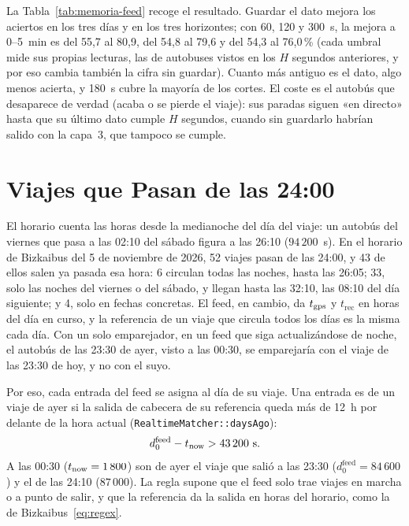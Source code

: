 La Tabla~\ref{tab:memoria-feed} recoge el resultado. Guardar el dato mejora los aciertos en los tres días y en los tres
horizontes; con 60, 120 y 300~s, la mejora a 0--5~min es del 55{,}7 al 80{,}9, del 54{,}8 al 79{,}6 y del 54{,}3 al
76{,}0\,\% (cada umbral mide sus propias lecturas, las de autobuses vistos en los $H$ segundos anteriores, y por eso
cambia también la cifra sin guardar). Cuanto más antiguo es el dato, algo menos acierta, y 180~s cubre la mayoría de
los cortes. El coste es el autobús que desaparece de verdad (acaba o se pierde el viaje): sus paradas siguen «en
directo» hasta que su último dato cumple $H$ segundos, cuando sin guardarlo habrían salido con la capa~3, que tampoco
se cumple.

\section{Viajes que Pasan de las 24:00}
\label{sec:mas-de-24h}

El horario cuenta las horas desde la medianoche del día del viaje: un autobús del viernes que pasa a las 02:10 del
sábado figura a las 26:10 ($94\,200$~s). En el horario de Bizkaibus del 5 de noviembre de 2026, 52 viajes pasan de las 24:00, y 43 de ellos salen ya pasada esa
hora: 6 circulan todas las noches, hasta las 26:05; 33, solo las noches del viernes o del sábado, y llegan hasta las
32:10, las 08:10 del día siguiente; y 4, solo en fechas concretas. El feed, en cambio, da $t_{\mathrm{gps}}$ y $t_{\mathrm{rec}}$ en horas del día en curso, y la referencia
de un viaje que circula todos los días es la misma cada día. Con un solo emparejador, en un feed que siga actualizándose de noche, el autobús de las
23:30 de ayer, visto a las 00:30, se emparejaría con el viaje de las 23:30 de hoy, y no con el suyo.

Por eso, cada entrada del feed se asigna al día de su viaje. Una entrada es de un viaje de ayer si la salida de cabecera
de su referencia queda más de 12~h por delante de la hora actual (\texttt{RealtimeMatcher::daysAgo}):
\begin{equation}
\label{eq:dia-viaje}
d_0^{\mathrm{feed}}-t_{\mathrm{now}}>43\,200\ \text{s}.
\end{equation}
A las 00:30 ($t_{\mathrm{now}}=1\,800$) son de ayer el viaje que salió a las 23:30 ($d_0^{\mathrm{feed}}=84\,600$) y el de las
24:10 ($87\,000$). La regla supone que el feed solo trae viajes en marcha o a punto de salir, y que la referencia da la
salida en horas del horario, como la de Bizkaibus~\eqref{eq:regex}.

